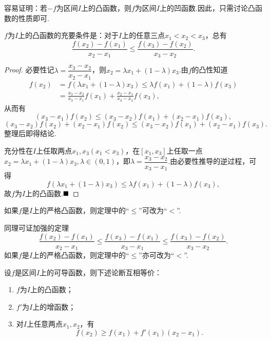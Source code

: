 容易证明：若$-f$为区间$I$上的凸函数，则$f$为区间$I$上的凹函数.因此，只需讨论凸函数的性质即可.
\begin{theorem}
	$f$为$I$上的凸函数的充要条件是：对于$I$上的任意三点$x_1<x_2<x_3$，总有
	$$\frac{f(x_2)-f(x_1)}{x_2-x_1}\leqslant\frac{f(x_3)-f(x_2)}{x_3-x_2}.$$
\end{theorem}
\begin{proof}
	必要性\qquad 记$\lambda=\dfrac{x_3-x_2}{x_2-x_1}$，则$x_2=\lambda x_1+(1-\lambda)x_3$.由$f$的凸性知道
	\begin{align*}
		f(x_2)&=f(\lambda x_1+(1-\lambda)x_3)\leqslant\lambda f(x_1)+(1-\lambda)f(x_3)\\
		&=\frac{x_3-x_2}{x_3-x_1}f(x_1)+\frac{x_2-x_1}{x_3-x_1}f(x_3),
	\end{align*}
	从而有$$(x_3-x_1)f(x_2)\leqslant(x_3-x_2)f(x_1)+(x_2-x_1)f(x_3),$$
	$$(x_3-x_2)f(x_2)+(x_2-x_1)f(x_2)\leqslant (x_3-x_2)f(x_1)+(x_2-x_1)f(x_3).$$
	整理后即得结论.
	
	充分性\qquad 在$I$上任取两点$x_1,x_3(x_1<x_3)$，在$\left[x_1,x_3\right]$上任取一点$x_2=\lambda x_1+(1-\lambda)x_3,\lambda\in(0,1)$，即$\lambda=\dfrac{x_3-x_2}{x_3-x_1}$.由必要性推导的逆过程，可得
	$$f(\lambda x_1+(1-\lambda)x_3)\leqslant\lambda f(x_1)+(1-\lambda)f(x_3),$$
	故$f$为$I$上的凸函数.$\hfill\blacksquare$
\end{proof}
\begin{remark}
	如果$f$是$I$上的严格凸函数，则定理中的“$\leqslant$”可改为“$<$”.
\end{remark}
\begin{remark}
	同理可证加强的定理
	$$\frac{f(x_2)-f(x_1)}{x_2-x_1}\leqslant\frac{f(x_3)-f(x_1)}{x_3-x_1}\leqslant\frac{f(x_3)-f(x_2)}{x_3-x_2}.$$
	如果$f$是$I$上的严格凸函数，则定理中的“$\leqslant$”亦可改为“$<$”.
\end{remark}
\begin{theorem}
	设$f$是区间$I$上的可导函数，则下述论断互相等价：
	\begin{enumerate}
		\item $f$为$I$上的凸函数；
		\item $f'$为$I$上的增函数；
		\item 对$I$上任意两点$x_1,x_2$，有
		$$f(x_2)\geqslant f(x_1)+f'(x_1)(x_2-x_1).$$
	\end{enumerate}
\end{theorem}
